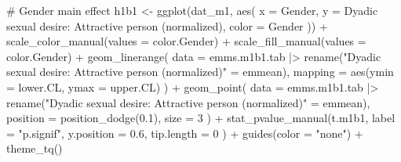 \documentclass[
  bookmarksnumbered]{article}
\newenvironment{Shaded}{\begin{snugshade}}{\end{snugshade}}
\newcommand{\AttributeTok}[1]{\textcolor[rgb]{0.80,0.80,0.80}{#1}}
\newcommand{\CommentTok}[1]{\textcolor[rgb]{0.50,0.62,0.50}{#1}}
\newcommand{\DecValTok}[1]{\textcolor[rgb]{0.86,0.86,0.80}{#1}}
\newcommand{\FloatTok}[1]{\textcolor[rgb]{0.75,0.75,0.82}{#1}}
\newcommand{\FunctionTok}[1]{\textcolor[rgb]{0.94,0.94,0.56}{#1}}
\newcommand{\NormalTok}[1]{\textcolor[rgb]{0.80,0.80,0.80}{#1}}
\newcommand{\OtherTok}[1]{\textcolor[rgb]{0.94,0.94,0.56}{#1}}
\newcommand{\SpecialCharTok}[1]{\textcolor[rgb]{0.86,0.64,0.64}{#1}}
\newcommand{\StringTok}[1]{\textcolor[rgb]{0.80,0.58,0.58}{#1}}
\begin{document}
\begin{Shaded}
\begin{Highlighting}[]
\CommentTok{\# Gender main effect}
\NormalTok{h1b1 }\OtherTok{\textless{}{-}} \FunctionTok{ggplot}\NormalTok{(dat\_m1, }\FunctionTok{aes}\NormalTok{(}
  \AttributeTok{x =}\NormalTok{ Gender, }\AttributeTok{y =} \StringTok{\textasciigrave{}}\AttributeTok{Dyadic sexual desire: Attractive person (normalized)}\StringTok{\textasciigrave{}}\NormalTok{,}
  \AttributeTok{color =}\NormalTok{ Gender}
\NormalTok{)) }\SpecialCharTok{+}
  \FunctionTok{scale\_color\_manual}\NormalTok{(}\AttributeTok{values =}\NormalTok{ color.Gender) }\SpecialCharTok{+}
  \FunctionTok{scale\_fill\_manual}\NormalTok{(}\AttributeTok{values =}\NormalTok{ color.Gender) }\SpecialCharTok{+}
  \FunctionTok{geom\_linerange}\NormalTok{(}
    \AttributeTok{data =}\NormalTok{ emms.m1b1.tab }\SpecialCharTok{|\textgreater{}}
      \FunctionTok{rename}\NormalTok{(}\StringTok{"Dyadic sexual desire: Attractive person (normalized)"} \OtherTok{=}\NormalTok{ emmean),}
    \AttributeTok{mapping =} \FunctionTok{aes}\NormalTok{(}\AttributeTok{ymin =}\NormalTok{ lower.CL, }\AttributeTok{ymax =}\NormalTok{ upper.CL)}
\NormalTok{  ) }\SpecialCharTok{+}
  \FunctionTok{geom\_point}\NormalTok{(}
    \AttributeTok{data =}\NormalTok{ emms.m1b1.tab }\SpecialCharTok{|\textgreater{}}
      \FunctionTok{rename}\NormalTok{(}\StringTok{"Dyadic sexual desire: Attractive person (normalized)"} \OtherTok{=}\NormalTok{ emmean),}
    \AttributeTok{position =} \FunctionTok{position\_dodge}\NormalTok{(}\FloatTok{0.1}\NormalTok{),}
    \AttributeTok{size =} \DecValTok{3}
\NormalTok{  ) }\SpecialCharTok{+}
  \FunctionTok{stat\_pvalue\_manual}\NormalTok{(t.m1b1,}
    \AttributeTok{label =} \StringTok{"p.signif"}\NormalTok{,}
    \AttributeTok{y.position =} \FloatTok{0.6}\NormalTok{,}
    \AttributeTok{tip.length =} \DecValTok{0}
\NormalTok{  ) }\SpecialCharTok{+}
  \FunctionTok{guides}\NormalTok{(}\AttributeTok{color =} \StringTok{"none"}\NormalTok{) }\SpecialCharTok{+}
  \FunctionTok{theme\_tq}\NormalTok{()}


\end{Highlighting}
\end{Shaded}
\end{document}
